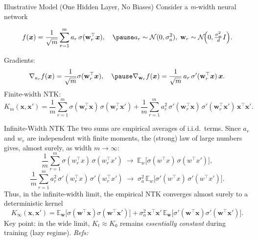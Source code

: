 \documentclass[10pt,aspectratio=169]{beamer}
\newcommand{\E}{\mathbb{E}}
\newcommand{\bx}{\boldsymbol{x}}
\begin{document}
\begin{frame}{Illustrative Model (One Hidden Layer, No Biases)}
	Consider a \textit{m}-width neural network

	\[
		f(\bx)=\frac{1}{\sqrt{m}}\sum_{r=1}^m a_r\, \sigma(\mathbf{w}_r^{\top} \bx),\quad \pause
		a_r\sim\mathcal N(0,\sigma_a^2),\;
		\mathbf{w}_r\sim\mathcal N\!\Big(0,\tfrac{\sigma_w^2}{d}I\Big).
	\]

	\pause
	Gradients:
	\[
		\nabla_{a_r} f(\bx)=\frac{1}{\sqrt{m}}\sigma(\mathbf{w}_r^{\top} \bx),\quad
		\pause
		\nabla_{\mathbf{w}_r} f(\bx)=\frac{1}{\sqrt{m}}\,a_r\,\sigma'(\mathbf{w}_r^{\top} \bx)\,\bx.
	\]
	\pause
	Finite-width NTK:
	\[
		\boxed{
		K_m(\bx,\bx')
		=\frac{1}{m}\sum_{r=1}^m \sigma(\mathbf{w}_r^{\top} \bx)\,\sigma(\mathbf{w}_r^{\top} \bx')
		+\frac{1}{m}\sum_{r=1}^m a_r^{2}\,\sigma'(\mathbf{w}_r^{\top} \bx)\,\sigma'(\mathbf{w}_r^{\top} \bx')\,\bx^{\top}\bx'.
		}
	\]
\end{frame}

\begin{frame}{Infinite-Width NTK}
	The two sums are empirical averages of i.i.d.\ terms. Since $a_r$ and $w_r$ are independent with finite moments,
	the (strong) law of large numbers gives, almost surely, as width $m\to\infty$:
	\pause
	\[
		\frac{1}{m}\sum_{r=1}^m \sigma(w_r^\top x)\,\sigma(w_r^\top x')
		\;\longrightarrow\;
		\mathbb E_{w}\big[\sigma(w^\top x)\,\sigma(w^\top x')\big],
	\]
	\pause
	\[
		\frac{1}{m}\sum_{r=1}^m a_r^2\,\sigma'(w_r^\top x)\,\sigma'(w_r^\top x')
		\;\longrightarrow\;
		\sigma_a^2\,\mathbb E_{w}\big[\sigma'(w^\top x)\,\sigma'(w^\top x')\big].
	\]
	\pause
	Thus, in the infinite-width limit, the empirical NTK converges almost surely to a deterministic kernel
	\[
		\boxed{
			K_{\infty}(\bx,\bx')=
			\E_{\mathbf{w}}\!\big[\sigma(\mathbf{w}^{\top}\bx)\sigma(\mathbf{w}^{\top}\bx')\big]
			+\sigma_a^2\,\bx^{\top}\bx'\,\E_{\mathbf{w}}\!\big[\sigma'(\mathbf{w}^{\top}\bx)\sigma'(\mathbf{w}^{\top}\bx')\big].
		}
	\]
	\pause
	Key point: in the wide limit, $K_t\approx K_0$ remains \emph{essentially constant} during training (lazy regime).
	\vspace{0.4em}
	\footnotesize \emph{Refs:} \citep{neal1996priors,lee2019wide}\normalsize

\end{frame}
\end{document}
